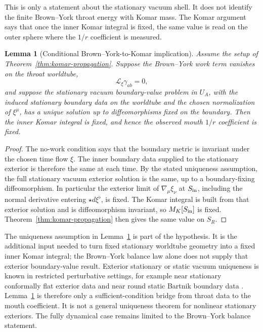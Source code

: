 \documentclass[aps,prd,10pt,onecolumn,nofootinbib,superscriptaddress,floatfix]{revtex4-2}
\newtheorem{lemma}{Lemma}
\begin{document}
This is only a statement about the stationary vacuum shell.  It does not
identify the finite Brown--York throat energy with Komar mass.  The Komar
argument says that once the inner Komar integral is fixed, the same value is
read on the outer sphere where the $1/r$ coefficient is measured.

\begin{lemma}[Conditional Brown--York-to-Komar implication]
\label{lem:BY-komar}
Assume the setup of Theorem~\ref{thm:komar-propagation}.  Suppose the
Brown--York work term vanishes on the throat worldtube,
\begin{equation}
  \mathcal L_\xi\gamma_{ab}=0,
\end{equation}
and suppose the stationary vacuum boundary-value problem in $U_A$, with the
induced stationary boundary data on the worldtube and the chosen normalization
of $\xi^\mu$, has a unique solution up to diffeomorphisms fixed on the
boundary.  Then the inner Komar integral is fixed, and hence the observed mouth
$1/r$ coefficient is fixed.
\end{lemma}

\begin{proof}
The no-work condition says that the boundary metric is invariant under the
chosen time flow $\xi$.  The inner boundary data supplied to the stationary
exterior is therefore the same at each time.  By the stated uniqueness
assumption, the full stationary vacuum exterior solution is the same, up to a
boundary-fixing diffeomorphism.  In particular the
exterior limit of $\nabla_\mu\xi_\nu$ at $S_{\rm in}$, including the normal
derivative entering $\star d\xi^\flat$, is fixed.  The Komar integral is built
from that exterior solution and is diffeomorphism invariant, so
$M_K[S_{\rm in}]$ is fixed.  Theorem~\ref{thm:komar-propagation} then gives the
same value on $S_R$.
\end{proof}

The uniqueness assumption in Lemma~\ref{lem:BY-komar} is part of the hypothesis.
It is the additional input needed to turn fixed stationary worldtube geometry
into a fixed inner Komar integral; the Brown--York balance law alone does not
supply that exterior boundary-value result.  Exterior stationary or static
vacuum uniqueness is known in restricted perturbative settings, for example
near stationary conformally flat exterior data and near round static Bartnik
boundary data
\cite{Klenk1999StationaryVacuumExterior,Anderson2015ExteriorStaticVacuum}.
Lemma~\ref{lem:BY-komar} is therefore only a sufficient-condition bridge from
throat data to the mouth coefficient.  It is not a general uniqueness theorem
for nonlinear stationary exteriors.  The fully dynamical case remains limited
to the Brown--York balance statement.
\end{document}
